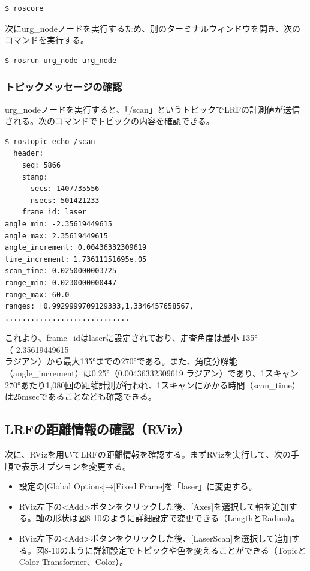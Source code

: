 \begin{lstlisting}[language=ROS]
$ roscore
\end{lstlisting}

次にurg\_nodeノードを実行するため、別のターミナルウィンドウを開き、次のコマンドを実行する。

\begin{lstlisting}[language=ROS]
$ rosrun urg_node urg_node
\end{lstlisting}

\subsubsection{トピックメッセージの確認}

urg\_nodeノードを実行すると、「/scan」というトピックでLRFの計測値が送信される。次のコマンドでトピックの内容を確認できる。

\begin{lstlisting}[language=ROS]
$ rostopic echo /scan
  header:
    seq: 5866
    stamp:
      secs: 1407735556
      nsecs: 501421233
    frame_id: laser
angle_min: -2.35619449615
angle_max: 2.35619449615
angle_increment: 0.00436332309619
time_increment: 1.73611151695e.05
scan_time: 0.0250000003725
range_min: 0.0230000000447
range_max: 60.0
ranges: [0.9929999709129333,1.3346457658567, .............................
\end{lstlisting}

これより、frame\_idはlaserに設定されており、走査角度は最小-135°（-2.35619449615\\ラジアン）から最大135°までの270°である。また、角度分解能（angle\_increment）は0.25°（0.00436332309619 ラジアン）であり、1スキャン270°あたり1,080回の距離計測が行われ、1スキャンにかかる時間（scan\_time）は25msecであることなども確認できる。

\subsection{LRFの距離情報の確認（RViz）}

次に、RVizを用いてLRFの距離情報を確認する。まずRVizを実行して、次の手順で表示オプションを変更する。

\begin{itemize}
\item 設定の[Global Options]→[Fixed Frame]を「laser」に変更する。
\item RViz左下の<Add>ボタンをクリックした後、[Axes]を選択して軸を追加する。軸の形状は図8-10のように詳細設定で変更できる（LengthとRadius）。
\item RViz左下の<Add>ボタンをクリックした後、[LaserScan]を選択して追加する。図8-10のように詳細設定でトピックや色を変えることができる（TopicとColor Transformer、Color）。
\end{itemize}

